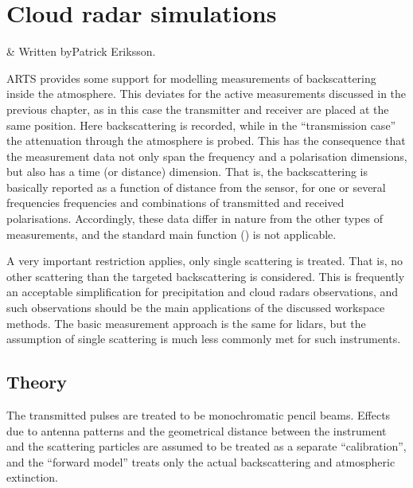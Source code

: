 \chapter{Cloud radar simulations}
 \label{sec:cradar}


 & Written byPatrick Eriksson.\\
\stophistory

ARTS provides some support for modelling measurements of backscattering inside
the atmosphere. This deviates for the active measurements discussed in the
previous chapter, as in this case the transmitter and receiver are placed at the
same position. Here backscattering is recorded, while in the ``transmission
case'' the attenuation through the atmosphere is probed. This has the
consequence that the measurement data not only span the frequency and a
polarisation dimensions, but also has a time (or distance) dimension. That is,
the backscattering is basically reported as a function of distance from the
sensor, for one or several frequencies frequencies and combinations of
transmitted and received polarisations. Accordingly, these data differ in
nature from the other types of measurements, and the standard main function 
() is not applicable.

A very important restriction applies, only single scattering is treated. That
is, no other scattering than the targeted backscattering is considered. This is
frequently an acceptable simplification for precipitation and cloud radars
observations, and such observations should be the main applications of the
discussed workspace methods. The basic measurement approach is the same for
lidars, but the assumption of single scattering is much less commonly met for
such instruments.


\section{Theory}
\label{sec:cradar:theory}

The transmitted pulses are treated to be monochromatic pencil beams. Effects
due to antenna patterns and the geometrical distance between the instrument and
the scattering particles are assumed to be treated as a separate
``calibration'', and the ``forward model'' treats only the actual
backscattering and atmospheric extinction. 

